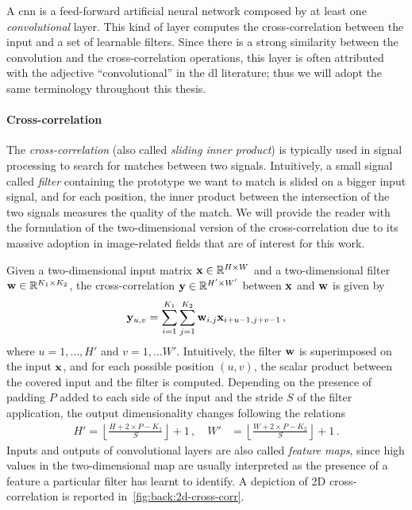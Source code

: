 A \gls{cnn} is a feed-forward artificial neural network composed by at least one \emph{convolutional} layer.
This kind of layer computes the cross-correlation between the input and a set of learnable filters.
Since there is a strong similarity between the convolution and the cross-correlation operations, this layer is often attributed with the adjective ``convolutional'' in the \gls{dl} literature;
thus we will adopt the same terminology throughout this thesis.

\paragraph{Cross-correlation}
The \emph{cross-correlation} (also called \emph{sliding inner product}) is typically used in signal processing to search for matches between two signals.
Intuitively, a small signal called \emph{filter} containing the prototype we want to match is slided on a bigger input signal, and for each position, the inner product between the intersection of the two signals measures the quality of the match.
We will provide the reader with the formulation of the two-dimensional version of the cross-correlation due to its massive adoption in image-related fields that are of interest for this work.

Given a two-dimensional input matrix $\mathbf{x} \in \mathbb{R}^{H \times W}$ and a two-dimensional filter $\mathbf{w} \in \mathbb{R}^{K_1 \times K_2}$, %
the cross-correlation $\mathbf{y} \in \mathbb{R}^{H' \times W'}$ between $\mathbf{x}$ and $\mathbf{w}$ is given by
%
\begin{equation}\label{eq:back:cross-correlation}
    \mathbf{y}_{u,v} = \sum_{i=1}^{K_1} \sum_{j=1}^{K_2} \mathbf{w}_{i,j} \mathbf{x}_{i+u-1,j+v-1} \,,
\end{equation}
%
where $u = 1, \dots, H'$ and $v = 1, \dots W'$.
Intuitively, the filter $\mathbf{w}$ is superimposed on the input $\mathbf{x}$, and for each possible position $(u,v)$, the scalar product between the covered input and the filter is computed.
Depending on the presence of padding $P$ added to each side of the input and the stride $S$ of the filter application, the output dimensionality changes following the relations
\begin{equation} \label{eq:back:conv-size}
\begin{split}
    H' = \left \lfloor \frac{H + 2 \times P - K_1}{S} \right \rfloor + 1 \,,\quad
    W' &= \left \lfloor \frac{W + 2 \times P - K_2}{S} \right \rfloor + 1 \,.
\end{split}
\end{equation}
Inputs and outputs of convolutional layers are also called \emph{feature maps}, since high values in the two-dimensional map are usually interpreted as the presence of a feature a particular filter has learnt to identify.
A depiction of 2D cross-correlation is reported in~\ref{fig:back:2d-cross-corr}.

